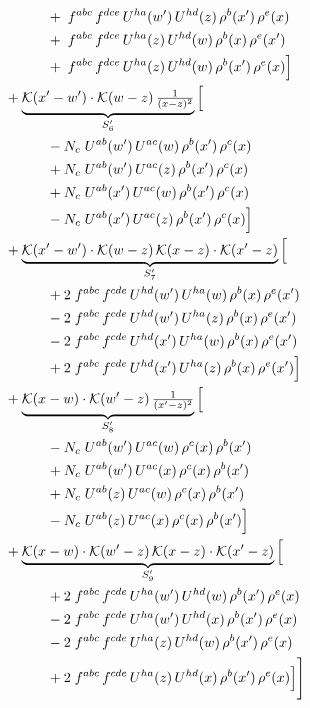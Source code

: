 \documentclass[10pt]{article}
\numberwithin{equation}{section}
\begin{document}
\begin{align}
&\qquad\qquad +\;f^{abc}\,f^{dce}\,U^{ha}(w')\,U^{hd}(z)\,\rho^{b}(x')\,\rho^{e}(x)\notag\\
&\qquad\qquad +\;f^{abc}\,f^{dce}\,U^{ha}(z)\,U^{hd}(w)\,\rho^{b}(x)\,\rho^{e}(x')\notag\\
&\qquad\qquad +\;f^{abc}\,f^{dce}\,U^{ha}(z)\,U^{hd}(w)\,\rho^{b}(x')\,\rho^{e}(x)\Big]\notag\\
&\quad +\underbrace{\mathcal{K}(x'-w')\cdot\mathcal{K}(w-z)\,\tfrac{1}{(x-z)^{2}}}_{S'_{6}}\Big[\notag\\
&\qquad\qquad -N_c\;U^{ab}(w')\,U^{ac}(w)\,\rho^{b}(x')\,\rho^{c}(x)\notag\\
&\qquad\qquad +N_c\;U^{ab}(w')\,U^{ac}(z)\,\rho^{b}(x')\,\rho^{c}(x)\notag\\
&\qquad\qquad +N_c\;U^{ab}(x')\,U^{ac}(w)\,\rho^{b}(x')\,\rho^{c}(x)\notag\\
&\qquad\qquad -N_c\;U^{ab}(x')\,U^{ac}(z)\,\rho^{b}(x')\,\rho^{c}(x)\Big]\notag\\
&\quad +\underbrace{\mathcal{K}(x'-w')\cdot\mathcal{K}(w-z)\,\mathcal{K}(x-z)\cdot\mathcal{K}(x'-z)}_{S'_{7}}\Big[\notag\\
&\qquad\qquad +2\;f^{abc}\,f^{cde}\,U^{hd}(w')\,U^{ha}(w)\,\rho^{b}(x)\,\rho^{e}(x')\notag\\
&\qquad\qquad -2\;f^{abc}\,f^{cde}\,U^{hd}(w')\,U^{ha}(z)\,\rho^{b}(x)\,\rho^{e}(x')\notag\\
&\qquad\qquad -2\;f^{abc}\,f^{cde}\,U^{hd}(x')\,U^{ha}(w)\,\rho^{b}(x)\,\rho^{e}(x')\notag\\
&\qquad\qquad +2\;f^{abc}\,f^{cde}\,U^{hd}(x')\,U^{ha}(z)\,\rho^{b}(x)\,\rho^{e}(x')\Big]\notag\\
&\quad +\underbrace{\mathcal{K}(x-w)\cdot\mathcal{K}(w'-z)\,\tfrac{1}{(x'-z)^{2}}}_{S'_{8}}\Big[\notag\\
&\qquad\qquad -N_c\;U^{ab}(w')\,U^{ac}(w)\,\rho^{c}(x)\,\rho^{b}(x')\notag\\
&\qquad\qquad +N_c\;U^{ab}(w')\,U^{ac}(x)\,\rho^{c}(x)\,\rho^{b}(x')\notag\\
&\qquad\qquad +N_c\;U^{ab}(z)\,U^{ac}(w)\,\rho^{c}(x)\,\rho^{b}(x')\notag\\
&\qquad\qquad -N_c\;U^{ab}(z)\,U^{ac}(x)\,\rho^{c}(x)\,\rho^{b}(x')\Big]\notag\\
&\quad +\underbrace{\mathcal{K}(x-w)\cdot\mathcal{K}(w'-z)\,\mathcal{K}(x-z)\cdot\mathcal{K}(x'-z)}_{S'_{9}}\Big[\notag\\
&\qquad\qquad +2\;f^{abc}\,f^{cde}\,U^{ha}(w')\,U^{hd}(w)\,\rho^{b}(x')\,\rho^{e}(x)\notag\\
&\qquad\qquad -2\;f^{abc}\,f^{cde}\,U^{ha}(w')\,U^{hd}(x)\,\rho^{b}(x')\,\rho^{e}(x)\notag\\
&\qquad\qquad -2\;f^{abc}\,f^{cde}\,U^{ha}(z)\,U^{hd}(w)\,\rho^{b}(x')\,\rho^{e}(x)\notag\\
&\qquad\qquad +2\;f^{abc}\,f^{cde}\,U^{ha}(z)\,U^{hd}(x)\,\rho^{b}(x')\,\rho^{e}(x)\Big]\Bigg]\label{eq:Bexp}
\end{align}
\end{document}
